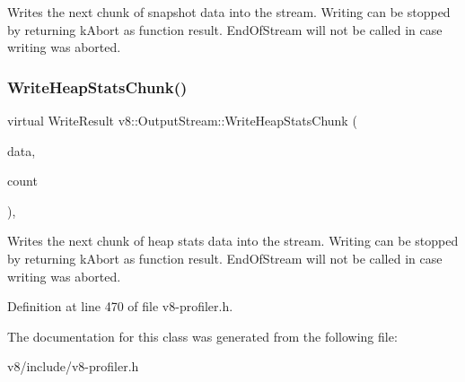 Writes the next chunk of snapshot data into the stream. Writing can be stopped by returning k\+Abort as function result. End\+Of\+Stream will not be called in case writing was aborted. \mbox{\label{classv8_1_1OutputStream_a104fd1a0b5ef685e1d4967aaacbb9e9d}} 
\subsubsection{\texorpdfstring{Write\+Heap\+Stats\+Chunk()}{WriteHeapStatsChunk()}}
{\footnotesize\ttfamily virtual Write\+Result v8\+::\+Output\+Stream\+::\+Write\+Heap\+Stats\+Chunk (\begin{DoxyParamCaption}\item[{\mbox{\hyperlink{structv8_1_1HeapStatsUpdate}{Heap\+Stats\+Update}} $\ast$}]{data,  }\item[{int}]{count }\end{DoxyParamCaption})\hspace{0.3cm}{\ttfamily [inline]}, {\ttfamily [virtual]}}

Writes the next chunk of heap stats data into the stream. Writing can be stopped by returning k\+Abort as function result. End\+Of\+Stream will not be called in case writing was aborted. 

Definition at line 470 of file v8-\/profiler.\+h.



The documentation for this class was generated from the following file\+:\begin{DoxyCompactItemize}
\item 
v8/include/v8-\/profiler.\+h\end{DoxyCompactItemize}
